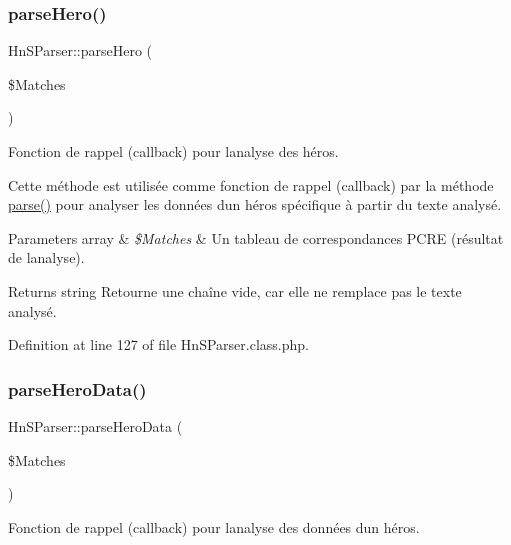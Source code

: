 \subsubsection{\texorpdfstring{parse\+Hero()}{parseHero()}}
{\footnotesize\ttfamily Hn\+S\+Parser\+::parse\+Hero (\begin{DoxyParamCaption}\item[{}]{\$\+Matches }\end{DoxyParamCaption})\hspace{0.3cm}{\ttfamily [protected]}}

Fonction de rappel (callback) pour l\textquotesingle{}analyse des héros.

Cette méthode est utilisée comme fonction de rappel (callback) par la méthode \hyperlink{class_hn_s_parser_a472740b8d6c5cc96019b67fe6304d828}{parse()} pour analyser les données d\textquotesingle{}un héros spécifique à partir du texte analysé.


\begin{DoxyParams}[1]{Parameters}
array & {\em \$\+Matches} & Un tableau de correspondances P\+C\+RE (résultat de l\textquotesingle{}analyse).\\
\hline
\end{DoxyParams}
\begin{DoxyReturn}{Returns}
string Retourne une chaîne vide, car elle ne remplace pas le texte analysé. 
\end{DoxyReturn}


Definition at line 127 of file Hn\+S\+Parser.\+class.\+php.

\mbox{\label{class_hn_s_parser_a8090ef63c59e0802986e4ef011994575}} 
\subsubsection{\texorpdfstring{parse\+Hero\+Data()}{parseHeroData()}}
{\footnotesize\ttfamily Hn\+S\+Parser\+::parse\+Hero\+Data (\begin{DoxyParamCaption}\item[{}]{\$\+Matches }\end{DoxyParamCaption})\hspace{0.3cm}{\ttfamily [protected]}}

Fonction de rappel (callback) pour l\textquotesingle{}analyse des données d\textquotesingle{}un héros.

